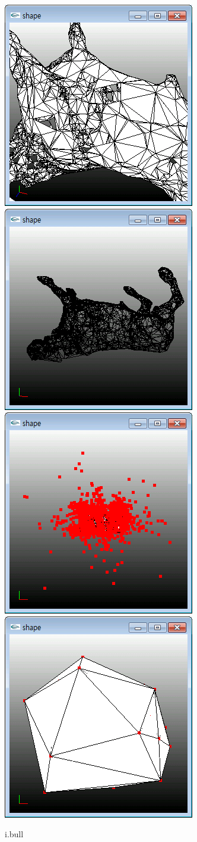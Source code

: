 \documentclass[11pt]{article}
\begin{document}
\begin{figure}[ht]
\centering
\includegraphics[width=.23\textwidth]{FIGS/bull1}
\hspace{0.2cm}
\includegraphics[width=.23\textwidth]{FIGS/bull2}
\hspace{0.2cm}
\includegraphics[width=.23\textwidth]{FIGS/bull3}
\hspace{0.2cm}
\includegraphics[width=.23\textwidth]{FIGS/bull4}
\caption{i.bull}
\end{figure}
\end{document}
